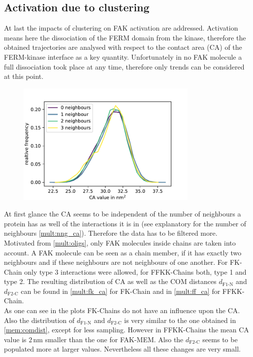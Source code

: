 \subsection{Activation due to clustering}
At last the impacts of clustering on FAK activation are addressed. Activation means here the dissociation of the FERM domain from the kinase, therefore the obtained trajectories are analysed with respect to the contact area (CA) of the FERM-kinase interface as a key quantity. Unfortunately in no FAK molecule a full dissociation took place at any time, therefore only trends can be considered at this point.\\
%
%
%
\begin{figure}
	\centering
	\includegraphics[height=6cm]{figures/results/nng_ca}
	\label{mult:nng_ca}
\end{figure}
%
%
%
At first glance the CA seems to be independent of the number of neighbours a protein has as well of the interactions it is in (see explanatory for the number of neighbours \autoref{mult:nng_ca}). Therefore the data has to be filtered more.\\
Motivated from \autoref{mult:oligs}, only FAK molecules inside chains are taken into account. A FAK molecule can be seen as a chain member, if it has exactly two neighbours and if these neighbours are not neighbours of one another. For FK-Chain only type 3 interactions were allowed, for FFKK-Chains both, type 1 and type 2. The resulting distribution of CA as well as the COM distances $d_\text{F1-N}$ and $d_\text{F2-C}$ can be found in \autoref{mult:fk_ca} for FK-Chain and in \autoref{mult:ff_ca} for FFKK-Chain.\\
As one can see in the plots FK-Chains do not have an influence upon the CA. Also the distribution of $d_\text{F1-N}$ and $d_\text{F2-C}$ is very similar to the one obtained in \autoref{mem:comdist}, except for less sampling. However in FFKK-Chains the mean CA value is $2\,\si{\nano\metre}$ smaller than the one for FAK-MEM. Also the $d_\text{F2-C}$ seems to be populated more at larger values. Nevertheless all these changes are very small.
